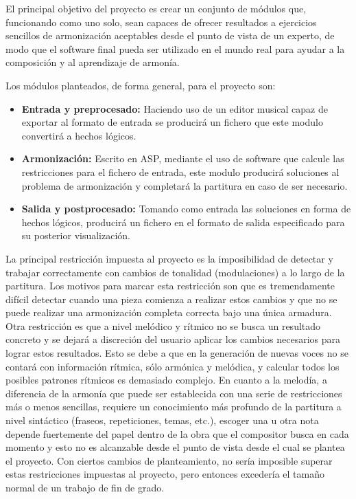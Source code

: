  El principal objetivo del proyecto es crear un conjunto de módulos que, funcionando como uno solo, sean capaces de ofrecer resultados a ejercicios sencillos de armonización aceptables desde el punto de vista de un experto, de modo que el software final pueda ser utilizado en el mundo real para ayudar a la composición y al aprendizaje de armonía.
 
 Los módulos planteados, de forma general, para el proyecto son:
 \begin{itemize}
 	\item \textbf{Entrada y preprocesado:} Haciendo uso de un editor musical capaz de exportar al formato de entrada se producirá un fichero que este modulo convertirá a hechos lógicos.
 	\item \textbf{Armonización:} Escrito en ASP, mediante el uso de software que calcule las restricciones para el fichero de entrada, este modulo producirá soluciones al problema de armonización y completará la partitura en caso de ser necesario.
 	\item \textbf{Salida y postprocesado:} Tomando como entrada las soluciones en forma de hechos lógicos, producirá un fichero en el formato de salida especificado para su posterior visualización.
 \end{itemize}
 
 La principal restricción impuesta al proyecto es la imposibilidad de detectar y trabajar correctamente con cambios de tonalidad (modulaciones) a lo largo de la partitura. Los motivos para marcar esta restricción son que es tremendamente difícil detectar cuando una pieza comienza a realizar estos cambios y que no se puede realizar una armonización completa correcta bajo una única armadura. Otra restricción es que a nivel melódico y rítmico no se busca un resultado concreto y se dejará a discreción del usuario aplicar los cambios necesarios para lograr estos resultados. Esto se debe a que en la generación de nuevas voces no se contará con información rítmica, sólo armónica y melódica, y calcular todos los posibles patrones rítmicos es demasiado complejo. En cuanto a la melodía, a diferencia de la armonía que puede ser establecida con una serie de restricciones más o menos sencillas, requiere un conocimiento más profundo de la partitura a nivel sintáctico (fraseos, repeticiones, temas, etc.), escoger una u otra nota depende fuertemente del papel dentro de la obra que el compositor busca en cada momento y esto no es alcanzable desde el punto de vista desde el cual se plantea el proyecto. Con ciertos cambios de planteamiento, no sería imposible superar estas restricciones impuestas al proyecto, pero entonces excedería el tamaño normal de un trabajo de fin de grado.
 
